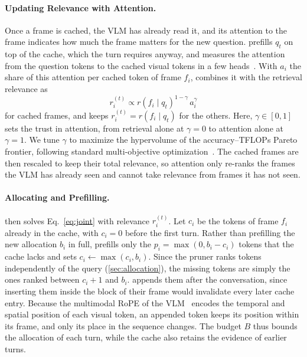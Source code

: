\paragraph{Updating Relevance with Attention.}
Once a frame is cached, the VLM has already read it, and its attention to the frame indicates how much the frame matters for the new question. \name prefills $q_t$ on top of the cache, which the turn requires anyway, and measures the attention from the question tokens to the cached visual tokens in a few heads~\cite{rekv2025}. With $a_i$ the share of this attention per cached token of frame $f_i$, \name combines it with the retrieval relevance as
\begin{equation}
  r_i^{(t)}\propto r(f_i\mid q_t)^{1-\gamma}\,a_i^{\gamma}
  \label{eq:fusion}
\end{equation}
for cached frames, and keeps $r_i^{(t)}=r(f_i\mid q_t)$ for the others. Here, $\gamma\in[0,1]$ sets the trust in attention, from retrieval alone at $\gamma=0$ to attention alone at $\gamma=1$. We tune $\gamma$ to maximize the hypervolume of the accuracy--TFLOPs Pareto frontier, following standard multi-objective optimization~\cite{karl2023multiobjective,daulton2020qehvi}. The cached frames are then rescaled to keep their total relevance, so attention only re-ranks the frames the VLM has already seen and cannot take relevance from frames it has not seen.

\paragraph{Allocating and Prefilling.}
\name then solves Eq.~\eqref{eq:joint} with relevance $r_i^{(t)}$. Let $c_i$ be the tokens of frame $f_i$ already in the cache, with $c_i=0$ before the first turn. Rather than prefilling the new allocation $b_i$ in full, \name prefills only the $p_i=\max(0,b_i-c_i)$ tokens that the cache lacks and sets $c_i\leftarrow\max(c_i,b_i)$. Since the pruner ranks tokens independently of the query (\cref{sec:allocation}), the missing tokens are simply the ones ranked between $c_i+1$ and $b_i$. \name appends them after the conversation, since inserting them inside the block of their frame would invalidate every later cache entry. Because the multimodal RoPE of the VLM~\cite{bai2025qwen3vl} encodes the temporal and spatial position of each visual token, an appended token keeps its position within its frame, and only its place in the sequence changes. The budget $B$ thus bounds the allocation of each turn, while the cache also retains the evidence of earlier turns.

